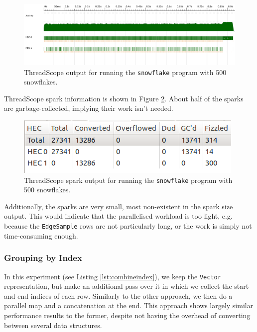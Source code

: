 \documentclass[12pt, a4paper]{article}
\begin{document}
 \begin{figure}[h!]
  \centering
  \includegraphics[width=\linewidth]{../threadscope/combinegrouped/bigflake}
  \caption{ThreadScope output for running the \texttt{snowflake} program with 500 snowflakes.}
  \label{fig:combinegrouped}
\end{figure}

ThreadScope spark information is shown in Figure \ref{fig:combinegrouped-sparks}. About half of the sparks are garbage-collected, implying their work isn't needed.

 \begin{figure}[h!]
  \centering
  \includegraphics[scale=1]{../threadscope/combinegrouped/sparks}
  \caption{ThreadScope spark output for running the \texttt{snowflake} program with 500 snowflakes.}
  \label{fig:combinegrouped-sparks}
\end{figure}

Additionally, the sparks are very small, most non-existent in the spark size output. This would indicate that the parallelised workload is too light, e.g. because the \texttt{EdgeSample} rows are not particularly long, or the work is simply not time-consuming enough.

\subsubsection{Grouping by Index}

In this experiment (see Listing \ref{lst:combineindex}), we keep the \texttt{Vector} representation, but make an additional pass over it in which we collect the start and end indices of each row. Similarly to the other approach, we then do a parallel map and a concatenation at the end. This approach shows largely similar performance results to the former, despite not having the overhead of converting between several data structures.
\end{document}
